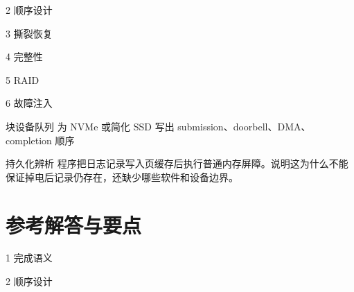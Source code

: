 \begin{chapterexercise}{2}
顺序设计
\end{chapterexercise}

\begin{chapterexercise}{3}
撕裂恢复
\end{chapterexercise}

\begin{chapterexercise}{4}
完整性
\end{chapterexercise}

\begin{chapterexercise}{5}
RAID
\end{chapterexercise}

\begin{chapterexercise}{6}
故障注入
\end{chapterexercise}

\begin{chapterexercise}{块设备队列}
为 NVMe 或简化 SSD 写出 submission、doorbell、DMA、completion 顺序
\end{chapterexercise}

\begin{chapterexercise}{持久化辨析}
程序把日志记录写入页缓存后执行普通内存屏障。说明这为什么不能保证掉电后记录仍存在，还缺少哪些软件和设备边界。
\end{chapterexercise}

\section*{参考解答与要点}

\begin{chapteranswer}{1}
完成语义
\end{chapteranswer}

\begin{chapteranswer}{2}
顺序设计
\end{chapteranswer}

